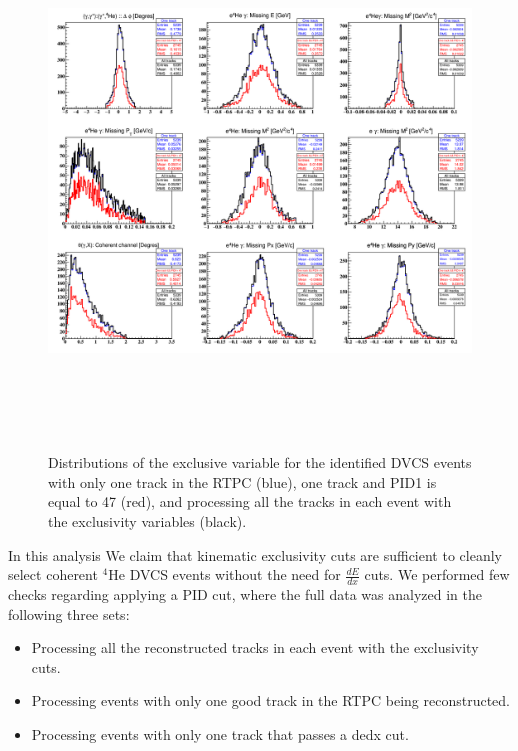 \begin{figure}[tbp]
      \hspace{-0.5cm}
      \includegraphics[height=14.2cm]{fig_dvcs/all_coh_pid.png}
      \caption{Distributions of the exclusive variable for the identified DVCS 
      events with only one track in the RTPC (blue), one track and PID1 is 
      equal to 47 (red), and processing all the tracks in each event with the 
      exclusivity variables (black).}
      \label{fig:dedx_check}
\end{figure}


In this analysis We claim that kinematic exclusivity cuts are sufficient to
cleanly select coherent $^4$He DVCS events without the need for $\frac{dE}{dx}$
cuts. We performed few checks regarding applying a PID cut, where the full data
was analyzed in the following three sets:
\begin{itemize}
\item Processing all the reconstructed tracks in each event with the exclusivity
cuts.
\item Processing events with only one good track in the RTPC being
reconstructed.
\item Processing events with only one track that passes a dedx cut.
\end{itemize}

